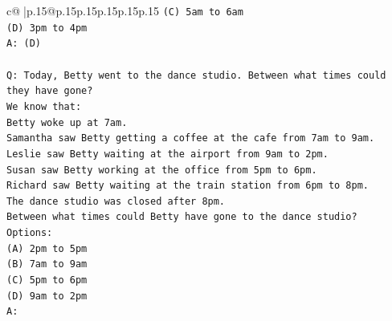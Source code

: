 \documentclass{article}
\begin{document}
{\begin{supertabular}{c@{$\;$}|p{.15\linewidth}@{}p{.15\linewidth}p{.15\linewidth}p{.15\linewidth}p{.15\linewidth}p{.15\linewidth}}
{{{\texttt{(C) 5am to 6am} \\
\texttt{(D) 3pm to 4pm} \\
\texttt{A: (D)} \\
\\ 
\texttt{Q: Today, Betty went to the dance studio. Between what times could they have gone?} \\
\texttt{We know that:} \\
\texttt{Betty woke up at 7am.} \\
\texttt{Samantha saw Betty getting a coffee at the cafe from 7am to 9am.} \\
\texttt{Leslie saw Betty waiting at the airport from 9am to 2pm.} \\
\texttt{Susan saw Betty working at the office from 5pm to 6pm.} \\
\texttt{Richard saw Betty waiting at the train station from 6pm to 8pm.} \\
\texttt{The dance studio was closed after 8pm.} \\
\texttt{Between what times could Betty have gone to the dance studio?} \\
\texttt{Options:} \\
\texttt{(A) 2pm to 5pm} \\
\texttt{(B) 7am to 9am} \\
\texttt{(C) 5pm to 6pm} \\
\texttt{(D) 9am to 2pm} \\
\texttt{A:} \\
            }
        }
    }
     \\ \\


\end{supertabular}}
\end{document}
